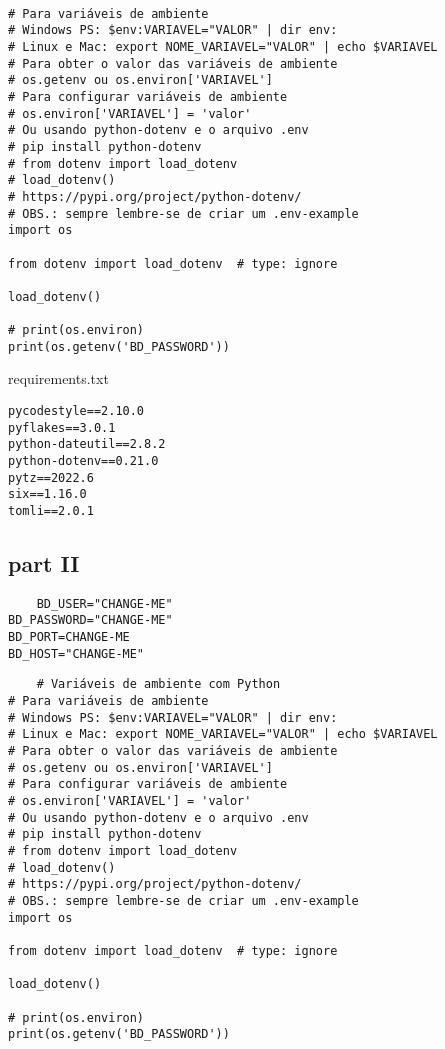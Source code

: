 \documentclass{article}
\begin{document}
\begin{lstlisting}
    
# Para variáveis de ambiente
# Windows PS: $env:VARIAVEL="VALOR" | dir env:
# Linux e Mac: export NOME_VARIAVEL="VALOR" | echo $VARIAVEL
# Para obter o valor das variáveis de ambiente
# os.getenv ou os.environ['VARIAVEL']
# Para configurar variáveis de ambiente
# os.environ['VARIAVEL'] = 'valor'
# Ou usando python-dotenv e o arquivo .env
# pip install python-dotenv
# from dotenv import load_dotenv
# load_dotenv()
# https://pypi.org/project/python-dotenv/
# OBS.: sempre lembre-se de criar um .env-example
import os

from dotenv import load_dotenv  # type: ignore

load_dotenv()

# print(os.environ)
print(os.getenv('BD_PASSWORD'))
\end{lstlisting}
requirements.txt
\begin{lstlisting}
pycodestyle==2.10.0
pyflakes==3.0.1
python-dateutil==2.8.2
python-dotenv==0.21.0
pytz==2022.6
six==1.16.0
tomli==2.0.1
\end{lstlisting}

\subsection{part II}

\begin{lstlisting}
    BD_USER="CHANGE-ME"
BD_PASSWORD="CHANGE-ME"
BD_PORT=CHANGE-ME
BD_HOST="CHANGE-ME"
\end{lstlisting}

\begin{lstlisting}
    # Variáveis de ambiente com Python
# Para variáveis de ambiente
# Windows PS: $env:VARIAVEL="VALOR" | dir env:
# Linux e Mac: export NOME_VARIAVEL="VALOR" | echo $VARIAVEL
# Para obter o valor das variáveis de ambiente
# os.getenv ou os.environ['VARIAVEL']
# Para configurar variáveis de ambiente
# os.environ['VARIAVEL'] = 'valor'
# Ou usando python-dotenv e o arquivo .env
# pip install python-dotenv
# from dotenv import load_dotenv
# load_dotenv()
# https://pypi.org/project/python-dotenv/
# OBS.: sempre lembre-se de criar um .env-example
import os

from dotenv import load_dotenv  # type: ignore

load_dotenv()

# print(os.environ)
print(os.getenv('BD_PASSWORD'))
\end{lstlisting}
\end{document}
